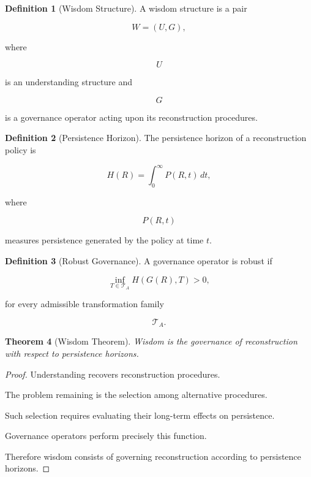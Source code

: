 \documentclass[12pt,oneside]{article}
\newtheorem{theorem}{Theorem}[section] \newtheorem{lemma}[theorem]{Lemma} \newtheorem{proposition}[theorem]{Proposition} \newtheorem{corollary}[theorem]{Corollary}
\theoremstyle{definition}
\newtheorem{definition}[theorem]{Definition} \newtheorem{axiom}[theorem]{Axiom} \newtheorem{remark}[theorem]{Remark} \newtheorem{example}[theorem]{Example}
\begin{document}
\begin{definition}[Wisdom Structure]

A wisdom structure is a pair

\[
W=(U,G),
\]

where

\[
U
\]

is an understanding structure and

\[
G
\]

is a governance operator acting upon its reconstruction procedures.

\end{definition}

\begin{definition}[Persistence Horizon]

The persistence horizon of a reconstruction policy is

\[
H(R)
=
\int_0^\infty
P(R,t)\,dt,
\]

where

\[
P(R,t)
\]

measures persistence generated by the policy at time \(t\).

\end{definition}

\begin{definition}[Robust Governance]

A governance operator is robust if

\[
\inf_{T\in\mathcal T_A}
H(G(R),T)
>
0,
\]

for every admissible transformation family

\[
\mathcal T_A.
\]

\end{definition}

\begin{theorem}[Wisdom Theorem]

Wisdom is the governance of reconstruction with respect to persistence horizons.

\end{theorem}

\begin{proof}

Understanding recovers reconstruction procedures.

The problem remaining is the selection among alternative procedures.

Such selection requires evaluating their long-term effects on persistence.

Governance operators perform precisely this function.

Therefore wisdom consists of governing reconstruction according to persistence horizons.

\end{proof}
\end{document}
